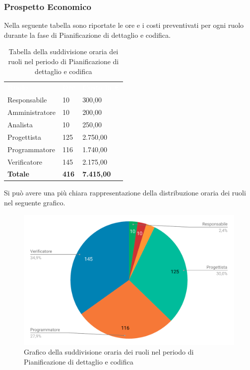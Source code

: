 \subsubsection{Prospetto Economico}
Nella seguente tabella sono riportate le ore e i costi preventivati per ogni ruolo durante la fase di Pianificazione di dettaglio e codifica.


\begin{table}[H]	
	\begin{center}
	    \begin{tabular}{C{4cm}C{1cm}C{3,5cm}}
			\textcolor{white}{\textbf{Ruolo}} & \textcolor{white}{\textbf{Ore}} & \textcolor{white}{\textbf{Costo in €}}
			\\ 
			Responsabile & 10 & 300,00 \\
			Amministratore & 10 & 200,00 \\
			Analista & 10 & 250,00 \\
			Progettista & 125 & 2.750,00 \\
			Programmatore & 116 & 1.740,00 \\
			Verificatore & 145 & 2.175,00 \\
			\textbf{Totale} & \textbf{416} & \textbf{7.415,00} \\
		\end{tabular}
	    \caption{Tabella della suddivisione oraria dei ruoli nel periodo di Pianificazione di dettaglio e codifica} \label{tab:tabellaRuoliPianificazione di dettaglio e codifica} 
	\end{center}
\end{table}


Si può avere una più chiara rappresentazione della distribuzione oraria dei ruoli nel seguente grafico.

\begin{figure}[H]
	\includegraphics[width=1\linewidth]{Preventivo/grafici/PC2.pdf}
	\caption{Grafico della suddivisione oraria dei ruoli nel periodo di Pianificazione di dettaglio e codifica}
\end{figure}

